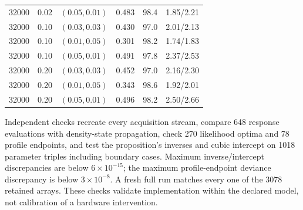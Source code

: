 \begin{table}[!htbp]
\begin{tabular}{@{}rrlrrl@{}}
32000 & 0.02 & $(0.05,0.01)$ & 0.483 & 98.4 & 1.85/2.21 \\
32000 & 0.10 & $(0.03,0.03)$ & 0.430 & 97.0 & 2.01/2.13 \\
32000 & 0.10 & $(0.01,0.05)$ & 0.301 & 98.2 & 1.74/1.83 \\
32000 & 0.10 & $(0.05,0.01)$ & 0.491 & 97.8 & 2.37/2.53 \\
32000 & 0.20 & $(0.03,0.03)$ & 0.452 & 97.0 & 2.16/2.30 \\
32000 & 0.20 & $(0.01,0.05)$ & 0.343 & 98.6 & 1.92/2.01 \\
32000 & 0.20 & $(0.05,0.01)$ & 0.496 & 98.2 & 2.50/2.66 \\
\bottomrule
\end{tabular}
\end{table}

\begin{samepage}
Independent checks recreate every acquisition stream, compare 648 response
evaluations with density-state propagation, check 270 likelihood optima and 78
profile endpoints, and test the proposition's inverses and cubic intercept on
1018 parameter triples including boundary cases. Maximum inverse/intercept
discrepancies are below $6\times10^{-15}$; the maximum profile-endpoint deviance
discrepancy is below $3\times10^{-8}$. A fresh full run matches every one of the
3078 retained arrays. These checks validate implementation within the declared
model, not calibration of a hardware intervention.
\end{samepage}
